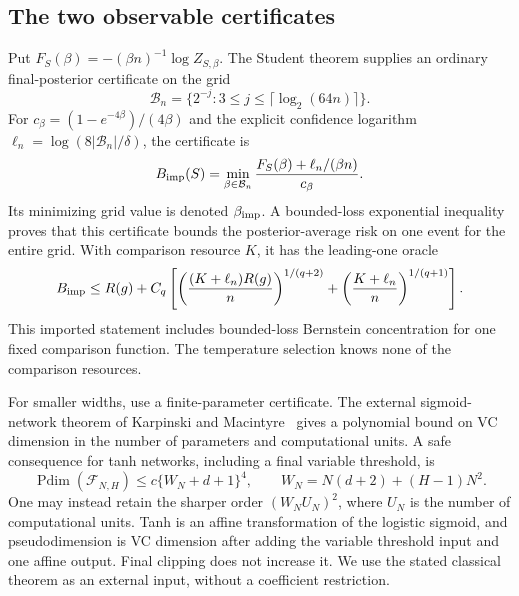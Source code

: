 \subsection{The two observable certificates}
Put $F_S(\beta)=-(\beta n)^{-1}\log Z_{S,\beta}$. The Student theorem supplies an ordinary final-posterior certificate on the grid
\[
 \mathcal B_n=\{2^{-j}:3\le j\le\lceil\log_2(64n)\rceil\}.
\]
For $c_\beta=(1-e^{-4\beta})/(4\beta)$ and the explicit confidence logarithm $\ell_n=\log(8|\mathcal B_n|/\delta)$, the certificate is
\[
 B_{\rm imp}(S)=\min_{\beta\in\mathcal B_n}
                \frac{F_S(\beta)+\ell_n/(\beta n)}{c_\beta}.
\]
Its minimizing grid value is denoted $\beta_{\rm imp}$. A bounded-loss exponential inequality proves that this certificate bounds the posterior-average risk on one event for the entire grid. With comparison resource $K$, it has the leading-one oracle
\begin{equation}
 B_{\rm imp}\le R(g)+C_q\left[
 \left(\frac{(K+\ell_n)R(g)}n\right)^{1/(q+2)}
       +\left(\frac{K+\ell_n}n\right)^{1/(q+1)}\right].
 \label{eq:Student-certificate-oracle}
\end{equation}
This imported statement includes bounded-loss Bernstein concentration for one fixed comparison function. The temperature selection knows none of the comparison resources.

For smaller widths, use a finite-parameter certificate. The external sigmoid-network theorem of Karpinski and Macintyre~\cite{karpinski} gives a polynomial bound on VC dimension in the number of parameters and computational units. A safe consequence for tanh networks, including a final variable threshold, is
\begin{equation}
 \operatorname{Pdim}(\mathcal F_{N,H})
 \le c\{W_N+d+1\}^4,
 \qquad W_N=N(d+2)+(H-1)N^2.
 \label{eq:tanh-pseudodimension}
\end{equation}
One may instead retain the sharper order $(W_NU_N)^2$, where $U_N$ is the number of computational units. Tanh is an affine transformation of the logistic sigmoid, and pseudodimension is VC dimension after adding the variable threshold input and one affine output. Final clipping does not increase it. We use the stated classical theorem as an external input, without a coefficient restriction.

